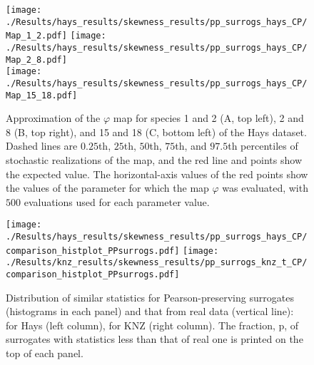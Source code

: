 \documentclass[letterpaper,11pt]{article}
\begin{document}





\begin{figure}
\texttt{[image: ./Results/hays\_results/skewness\_results/pp\_surrogs\_hays\_CP/Map\_1\_2.pdf]} 
\texttt{[image: ./Results/hays\_results/skewness\_results/pp\_surrogs\_hays\_CP/Map\_2\_8.pdf]} \\
\texttt{[image: ./Results/hays\_results/skewness\_results/pp\_surrogs\_hays\_CP/Map\_15\_18.pdf]}
\caption{Approximation of the $\varphi$ map for species 1 and 2 (A, top left), 2 and 8 (B, top right), and 15 and 18 (C, bottom left) 
of the Hays dataset. Dashed lines are $0.25$th, $25$th, $50$th, $75$th, and $97.5$th percentiles 
of stochastic realizations of the map, and
the red line and points show the expected value. The horizontal-axis values of the red 
points show the values of the
parameter for which the map $\varphi$ was evaluated, with $500$ evaluations used for
each parameter value.}\label{fig:varphiexample}
\end{figure}


\begin{figure}
\texttt{[image: ./Results/hays\_results/skewness\_results/pp\_surrogs\_hays\_CP/comparison\_histplot\_PPsurrogs.pdf]}
\texttt{[image: ./Results/knz\_results/skewness\_results/pp\_surrogs\_knz\_t\_CP/comparison\_histplot\_PPsurrogs.pdf]}  
\caption{Distribution of similar statistics for Pearson-preserving surrogates (histograms in each panel) and that from real data (vertical line): for Hays (left column), for KNZ (right column). The fraction, p, of surrogates with statistics less than that of real one is printed on the top of each panel.}\label{fig:check_cov_var_vr}
\end{figure}
\end{document}
